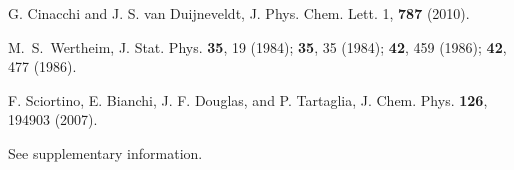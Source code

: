 \documentclass[8.5pt,oneside,onecolumn]{article}
\begin{document}
{\begin{thebibliography}{99}
G. Cinacchi and J. S. van Duijneveldt, J. Phys. Chem.
Lett. 1, {\bf 787} (2010).

M.~S.~Wertheim, J. Stat. Phys. {\bf 35}, 19 (1984); {\bf 35}, 35 (1984); {\bf 42}, 459 (1986);  {\bf 42}, 477 (1986).

F. Sciortino, E. Bianchi, J. F. Douglas,
and P. Tartaglia, J. Chem. Phys. {\bf 126}, 194903 (2007).


See supplementary information.

\end{thebibliography}

}
\end{document}
